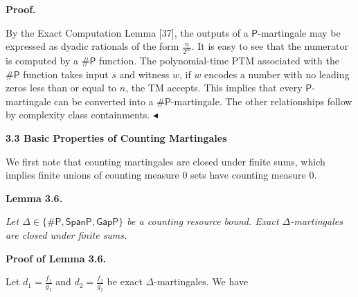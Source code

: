 \documentclass[10pt,a4paper]{article}
\begin{document}



\par\medskip\noindent\textbf{Proof.}\par




By the Exact Computation Lemma [37], the
outputs of a $\mathsf{P}$-martingale may be expressed as dyadic rationals of the form $\frac{n}{2^{m}}$. It is easy to see that
the numerator is computed by a ${\mathsf{\#}\mathsf{P}}$ function. The polynomial-time PTM associated with the ${\mathsf{\#}\mathsf{P}}$ function takes input $s$ and witness $w$, if $w$ encodes a number with no leading zeros less than or equal to $n$, the TM accepts. This implies that every $\mathsf{P}$-martingale can be converted into a ${\mathsf{\#}\mathsf{P}}$-martingale. The other relationships follow by complexity class containments.
$\blacktriangleleft$\par






\par\medskip\noindent\textbf{
3.3 Basic Properties of Counting Martingales}\par




We first note that counting martingales are closed under finite sums, which implies finite unions of counting measure 0 sets have counting measure 0.\par





\par\medskip\noindent\textbf{
\textbf{Lemma 3.6}\textbf{.}
}\par



\emph{Let $\Delta\in\{{\mathsf{\#}\mathsf{P}},\mathsf{SpanP},\mathsf{GapP}\}$ be a counting resource bound.
Exact $\Delta$-martingales are closed under finite sums.}\par






\par\medskip\noindent\textbf{Proof of Lemma 3.6.}\par




Let $d_{1}=\frac{f_{1}}{g_{1}}$ and $d_{2}=\frac{f_{2}}{g_{2}}$ be exact
$\Delta$-martingales. We have\par
\end{document}

